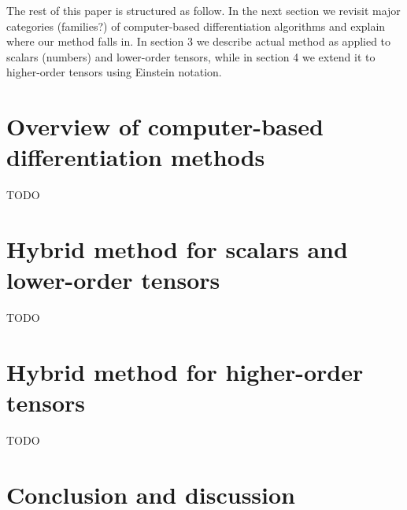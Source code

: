 \documentclass[conference]{IEEEtran}
\begin{document}
The rest of this paper is structured as follow. In the next section we revisit major categories (families?) of computer-based differentiation algorithms and explain where our method falls in. In section 3 we describe actual method as applied to scalars (numbers) and lower-order tensors, while in section 4 we extend it to higher-order tensors using  Einstein notation. 


\section{Overview of computer-based differentiation methods}

TODO 

\section{Hybrid method for scalars and lower-order tensors}

TODO

\section{Hybrid method for higher-order tensors}

TODO

\newpage

\section{Conclusion and discussion}





 




\end{document}
